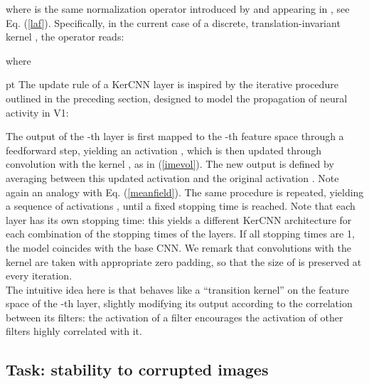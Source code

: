\documentclass[11pt,oneside,reqno]{amsart}
\begin{document}
 where  is the same normalization operator introduced by \citet{coiflaf} and appearing in \citet{neuro}, see Eq. (\ref{laf}). Specifically, in the current case of a discrete, translation-invariant kernel , the operator reads:
 
  where
  
   pt
  The update rule of a KerCNN layer is inspired by the iterative procedure outlined in the preceding section, designed to model the propagation of neural activity in V1:
  
 The output of the -th layer is first mapped to the -th feature space through a feedforward step, yielding an activation , which is then updated through convolution with the kernel , as in (\ref{imevol}). The new output  is defined by averaging between this updated activation  and the original activation . Note again an analogy with Eq. (\ref{meanfield}). The same procedure is repeated, yielding a sequence of activations , until a fixed stopping time  is reached. Note that each layer has its own stopping time: this yields a different KerCNN architecture for each combination of the stopping times  of the layers. If all stopping times are 1, the model coincides with the base CNN. We remark that convolutions with the kernel  are taken with appropriate zero padding, so that the size of  is preserved at every iteration. \\
 The intuitive idea here is that  behaves like a ``transition kernel'' on the feature space of the -th layer, slightly modifying its output according to the correlation between its filters: the activation of a filter encourages the activation of other filters highly correlated with it.
 
 
 \subsection{Task: stability to corrupted images}\label{task}
 
\end{document}
